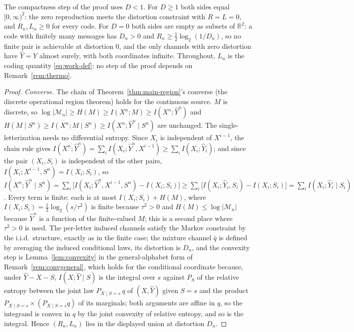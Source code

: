 \documentclass[11pt,onecolumn]{IEEEtran}
\newcommand{\R}{\mathbb{R}}
\newcommand{\hY}{\widehat{Y}}
\begin{document}
The compactness step of the proof uses $D<1$. For $D\ge1$ both sides
equal $[0,\infty)^2$: the zero reproduction meets the distortion
constraint with $R=L=0$, and $R_n,L_n\ge0$ for every code. For $D=0$
both sides are empty as subsets of $\R^2$: a code with finitely many
messages has $D_n>0$ and $R_n\ge\tfrac12\log_2(1/D_n)$, so no finite
pair is achievable at distortion $0$, and the only channels with zero
distortion have $\hY=Y$ almost surely, with both coordinates infinite.
Throughout, $L_n$ is the coding quantity
\eqref{eq:work-def}; no step of the proof depends on
Remark~\ref{rem:thermo}.

\begin{proof}
\emph{Converse.} The chain of Theorem~\ref{thm:main-region}'s converse
(the discrete operational region theorem) holds for the continuous
source.
$M$ is discrete, so $\log|\mathcal M_n|\ge H(M)\ge I(X^n;M)\ge
I(X^n;\hY^n)$ and $H(M\mid S^n)\ge I(X^n;M\mid S^n)\ge
I(X^n;\hY^n\mid S^n)$ are unchanged. The single-letterization needs no
differential entropy. Since $X_i$ is independent of $X^{i-1}$, the chain
rule gives
$I(X^n;\hY^n)=\sum_iI(X_i;\hY^n,X^{i-1})\ge\sum_iI(X_i;\hY_i)$; and since
the pair $(X_i,S_i)$ is independent of the other pairs,
$I(X_i;X^{i-1},S^n)=I(X_i;S_i)$, so
$I(X^n;\hY^n\mid S^n)=\sum_i\bigl[I(X_i;\hY^n,X^{i-1},S^n)-I(X_i;S_i)\bigr]
\ge\sum_i\bigl[I(X_i;\hY_i,S_i)-I(X_i;S_i)\bigr]=\sum_iI(X_i;\hY_i\mid S_i)$.
Every term is finite: each is at most $I(X_i;S_i)+H(M)$, where
$I(X_i;S_i)=\tfrac12\log_2(s/\tau^2)$ is finite because $\tau^2>0$ and
$H(M)\le\log|\mathcal M_n|$ because $\hY^n$ is a function of the
finite-valued $M$; this is a second place where $\tau^2>0$ is used. The per-letter induced channels satisfy the
Markov constraint by the i.i.d.\ structure, exactly as in the finite
case; the mixture channel $\bar q$ is defined by averaging the induced
conditional laws, its distortion is $D_n$, and the convexity step is
Lemma~\ref{lem:convexity} in the general-alphabet form of
Remark~\ref{rem:convgeneral}, which holds for the conditional coordinate
because, under $\hY-X-S$, $I(X;\hY\mid S)$ is the integral over $s$
against $P_S$ of the relative entropy between the joint law
$P_{X\mid S=s}\,q$ of $(X,\hY)$ given $S=s$ and the product
$P_{X\mid S=s}\times(P_{X\mid S=s}q)$ of its marginals; both arguments
are affine in $q$, so the integrand is convex in $q$ by the joint
convexity of relative entropy, and so is the integral. Hence
$(R_n,L_n)$ lies in the displayed union at distortion $D_n$.


\end{proof}
\end{document}
